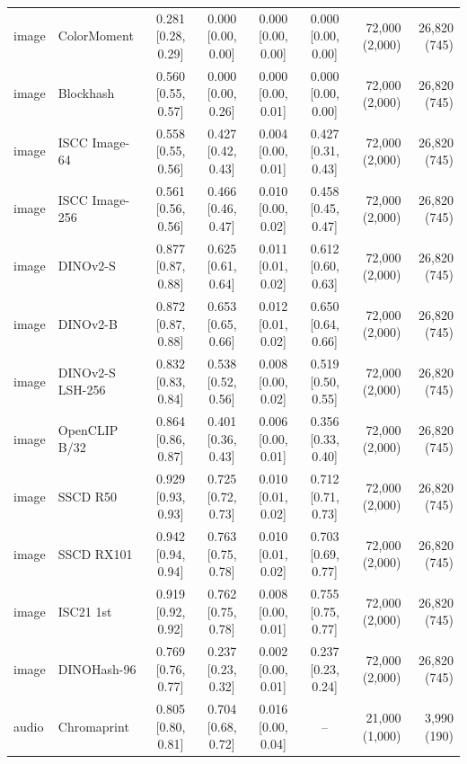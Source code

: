 \begin{table}[!t]
\begin{tabular}{llccccrr}
image & ColorMoment & 0.281 \tiny[0.28, 0.29] & 0.000 \tiny[0.00, 0.00] & 0.000 \tiny[0.00, 0.00] & 0.000 \tiny[0.00, 0.00] & 72{,}000 (2{,}000) & 26{,}820 (745) \\
image & Blockhash & 0.560 \tiny[0.55, 0.57] & 0.000 \tiny[0.00, 0.26] & 0.000 \tiny[0.00, 0.01] & 0.000 \tiny[0.00, 0.00] & 72{,}000 (2{,}000) & 26{,}820 (745) \\
image & ISCC Image-64 & 0.558 \tiny[0.55, 0.56] & 0.427 \tiny[0.42, 0.43] & 0.004 \tiny[0.00, 0.01] & 0.427 \tiny[0.31, 0.43] & 72{,}000 (2{,}000) & 26{,}820 (745) \\
image & ISCC Image-256 & 0.561 \tiny[0.56, 0.56] & 0.466 \tiny[0.46, 0.47] & 0.010 \tiny[0.00, 0.02] & 0.458 \tiny[0.45, 0.47] & 72{,}000 (2{,}000) & 26{,}820 (745) \\
image & DINOv2-S & 0.877 \tiny[0.87, 0.88] & 0.625 \tiny[0.61, 0.64] & 0.011 \tiny[0.01, 0.02] & 0.612 \tiny[0.60, 0.63] & 72{,}000 (2{,}000) & 26{,}820 (745) \\
image & DINOv2-B & 0.872 \tiny[0.87, 0.88] & 0.653 \tiny[0.65, 0.66] & 0.012 \tiny[0.01, 0.02] & 0.650 \tiny[0.64, 0.66] & 72{,}000 (2{,}000) & 26{,}820 (745) \\
image & DINOv2-S LSH-256 & 0.832 \tiny[0.83, 0.84] & 0.538 \tiny[0.52, 0.56] & 0.008 \tiny[0.00, 0.02] & 0.519 \tiny[0.50, 0.55] & 72{,}000 (2{,}000) & 26{,}820 (745) \\
image & OpenCLIP B/32 & 0.864 \tiny[0.86, 0.87] & 0.401 \tiny[0.36, 0.43] & 0.006 \tiny[0.00, 0.01] & 0.356 \tiny[0.33, 0.40] & 72{,}000 (2{,}000) & 26{,}820 (745) \\
image & SSCD R50 & 0.929 \tiny[0.93, 0.93] & 0.725 \tiny[0.72, 0.73] & 0.010 \tiny[0.01, 0.02] & 0.712 \tiny[0.71, 0.73] & 72{,}000 (2{,}000) & 26{,}820 (745) \\
image & SSCD RX101 & 0.942 \tiny[0.94, 0.94] & 0.763 \tiny[0.75, 0.78] & 0.010 \tiny[0.01, 0.02] & 0.703 \tiny[0.69, 0.77] & 72{,}000 (2{,}000) & 26{,}820 (745) \\
image & ISC21 1st & 0.919 \tiny[0.92, 0.92] & 0.762 \tiny[0.75, 0.78] & 0.008 \tiny[0.00, 0.01] & 0.755 \tiny[0.75, 0.77] & 72{,}000 (2{,}000) & 26{,}820 (745) \\
image & DINOHash-96 & 0.769 \tiny[0.76, 0.77] & 0.237 \tiny[0.23, 0.32] & 0.002 \tiny[0.00, 0.01] & 0.237 \tiny[0.23, 0.24] & 72{,}000 (2{,}000) & 26{,}820 (745) \\
audio & Chromaprint & 0.805 \tiny[0.80, 0.81] & 0.704 \tiny[0.68, 0.72] & 0.016 \tiny[0.00, 0.04] & -- & 21{,}000 (1{,}000) & 3{,}990 (190) \\

\end{tabular}
\end{table}
